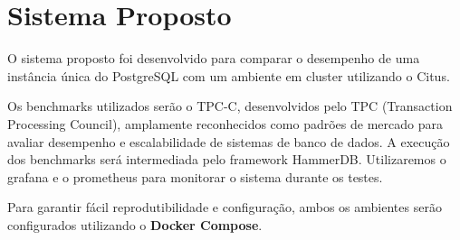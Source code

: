 \section{Sistema Proposto}

O sistema proposto foi desenvolvido para comparar o desempenho de uma instância única do PostgreSQL 
com um ambiente em cluster utilizando o Citus.

Os benchmarks utilizados serão o TPC-C, desenvolvidos pelo TPC (Transaction Processing Council),
amplamente reconhecidos como padrões de mercado para avaliar desempenho e escalabilidade de sistemas 
de banco de dados. A execução dos benchmarks será intermediada pelo framework HammerDB.
Utilizaremos o grafana e o prometheus para monitorar o sistema durante os testes.

Para garantir fácil reprodutibilidade e configuração, 
ambos os ambientes serão configurados utilizando o \textbf{Docker Compose}.

